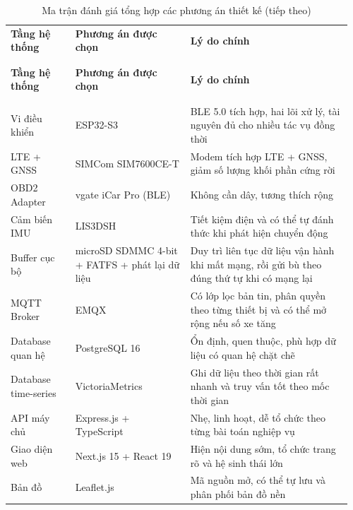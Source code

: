 \documentclass[a4paper]{extarticle}
\newcommand{\thesissettableid}[2]{%
  \renewcommand{\thetable}{#1}%
  \renewcommand{\theHtable}{#2}%
}
\begin{document}
{\thesissettableid{3.29}{tab-ch3-ma-tran-anh-gia-tong-hop-cac-phuong-an-thiet-ke}
\def\LTcaptype{table}
\begin{longtable}{|L{0.185\linewidth}|L{0.320\linewidth}|L{0.459\linewidth}|}
\caption{Ma trận đánh giá tổng hợp các phương án thiết kế}\label{tab:ch3-ma-tran-anh-gia-tong-hop-cac-phuong-an-thiet-ke}\\
\hline \textbf{Tầng hệ thống} & \textbf{Phương án được chọn} & \textbf{Lý do chính} \\
\\\hline
\endfirsthead
\caption[]{Ma trận đánh giá tổng hợp các phương án thiết kế (tiếp theo)}\\
\hline \textbf{Tầng hệ thống} & \textbf{Phương án được chọn} & \textbf{Lý do chính} \\
\\\hline
\endhead
\\\hline
\endfoot
\endlastfoot
Vi điều khiển & ESP32-S3 & BLE 5.0 tích hợp, hai lõi xử lý, tài nguyên đủ cho nhiều tác vụ đồng thời \\\hline
LTE + GNSS & SIMCom SIM7600CE-T & Modem tích hợp LTE + GNSS, giảm số
lượng khối phần cứng rời \\\hline
OBD2 Adapter & vgate iCar Pro (BLE) & Không cần dây, tương thích rộng \\\hline
Cảm biến IMU & LIS3DSH & Tiết kiệm điện và có thể tự đánh thức khi phát
hiện chuyển động \\\hline
Buffer cục bộ & microSD SDMMC 4-bit + FATFS + phát lại dữ liệu & Duy trì liên tục
dữ liệu vận hành khi mất mạng, rồi gửi bù theo đúng thứ tự khi có mạng lại \\\hline
MQTT Broker & EMQX & Có lớp lọc bản tin, phân quyền theo từng thiết bị
và có thể mở rộng nếu số xe tăng \\\hline
Database quan hệ & PostgreSQL 16 & Ổn định, quen thuộc, phù hợp dữ liệu
có quan hệ chặt chẽ \\\hline
Database time-series & VictoriaMetrics & Ghi dữ liệu theo thời gian rất
nhanh và truy vấn tốt theo mốc thời gian \\\hline
API máy chủ & Express.js + TypeScript & Nhẹ, linh hoạt, dễ tổ chức theo
từng bài toán nghiệp vụ \\\hline
Giao diện web & Next.js 15 + React 19 & Hiện nội dung sớm, tổ chức trang
rõ và hệ sinh thái lớn \\\hline
Bản đồ & Leaflet.js & Mã nguồn mở, có thể tự lưu và phân phối bản đồ nền \\\hline
\end{longtable}
}
\end{document}
